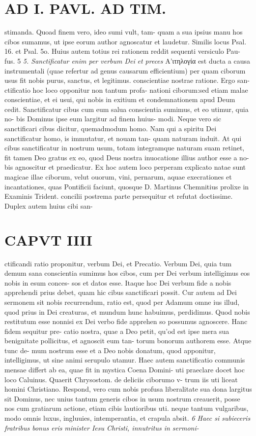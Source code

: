 \documentclass{article}
\begin{document}
\begin{pages}
\section*{AD I. PAVL. AD TIM. }
\marginpar{[ p.450 ]}stimanda. Quoad finem vero, ideo sumi vult, tam- quam a sua ipsius manu hos cibos sumamus, ut ipse eorum author agnoscatur et laudetur. Similis locus Psal. 16. et Psal. 5o. Huius autem totius rei rationem reddit sequenti versiculo Pau- fus. 5 \textit{5. Sanctificatur enim per verbum Dei} \textit{et preces} Α’ιτηλογία est ducta a causa instrumentali (quae refertur ad genus causarum efficientium) per quam ciborum usus fit nobis purus, sanctus, et legitimus. conscientiae nostrae ratione. Ergo san- ctificatio hoc loco opponitur non tantum profa- nationi ciborum:sed etiam malae conscientiae, et ei usui, qui nobis in exitium et condemnationem apud Deum cedit. Sanctificatur cibus cum eum salua conscientia sumimus, et eo utimur, quia no- bis Dominus ipse eum largitur ad finem huius- modi. Neque vero sic sanctificari cibus dicitur, quemadmodum homo. Nam qui a spiritu Dei sanctificatur homo, is immutatur, et nouam tan- quam naturam induit. At qui cibus sanctificatur in nostrum usum, totam integramque naturam suam retinet, fit tamen Deo gratus ex eo, quod Deus nostra inuocatione illius author esse a no- bis agnoscitur et praedicatur. Ex hoc autem loco perperam explicato natae sunt magicae illae ciborum, velut ouorum, vini, pernarum, aquae execrationes et incantationes, quas Pontificii faciunt, quosque D. Martinus Chemnitius prolixe in Examinis Trident. concilii postrema parte persequitur et refutat doctissime. Duplex autem huius cibi san- 
\section*{CAPVT  IIII }
\marginpar{[ p.19 ]}ctificandi ratio proponitur, verbum Dei, et Precatio. Verbum Dei, quia tum demum sana conscientia sumimus hos cibos, cum per Dei verbum intelligimus eos nobis in esum conces- sos et datos esse. Itaque hoc Dei verbum fide a nobis apprehendi prius debet, quam hic cibus sanctificari possit. Cur autem ad Dei sermonem sit nobis recurrendum, ratio est, quod per Adamum omne ius illud, quod prius in Dei creaturas, et mundum hunc habuimus, perdidimus. Quod nobis restitutum esse nonnisi ex Dei verbo fide apprehen so possumus agnoscere. Hanc fidem sequitur pre- catio nostra, quae a Deo petit, qu'od est ipse mera sua benignitate pollicitus, et agnoscit eum tan- torum bonorum authorem esse. Atque tunc de- mum nostrum esse et a Deo nobis donatum, quod apponitur, intelligimus, ut sine animi serupulo utamur. Haec autem sanctificatio communis mensae differt ab ea, quae fit in mystica Coena Domini- uti praeclare docet hoc loco Caluinus. Quaerit Chrysostom. de deliciis ciborumo v- trum iis uti liceat homini Christiano. Respond, vero cum nobis profusa liberalitate sua dona largitus sit Dominus, nec unius tantum generis cibos in usum nostrum creauerit, posse nos cum gratiarum actione, etiam cibis lautioribus uti. neque tantum vulgaribus, modo omnis luxus, ingluuies, intemperantia, et crapula absit. \textit{6 Haec si subieceris fratribus bonus eris} \textit{minister Iesu Christi, innutritus in sermoni-} 

\end{pages}
\end{document}
